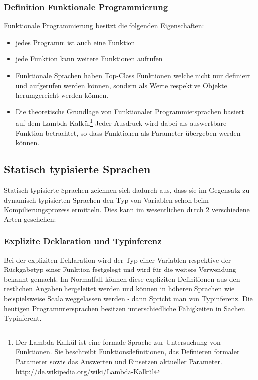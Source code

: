 \subsubsection{Definition Funktionale Programmierung}
Funktionale Programmierung besitzt die folgenden Eigenschaften:
\begin{itemize}
\item jedes Programm ist auch eine Funktion
\item jede Funktion kann weitere Funktionen aufrufen
\item Funktionale Sprachen haben Top-Class Funktionen welche nicht nur definiert und aufgerufen werden k\"onnen, sondern als Werte respektive Objekte herumgereicht werden k\"onnen.
\item Die theoretische Grundlage von Funktionaler Programmiersprachen basiert auf dem Lambda-Kalk\"ul\footnote{Der Lambda-Kalk\"ul ist eine formale Sprache zur Untersuchung von Funktionen. Sie beschreibt Funktionsdefinitionen, das Definieren formaler Parameter sowie das Auswerten und Einsetzen aktueller Parameter. http://de.wikipedia.org/wiki/Lambda-Kalk\"ul} Jeder Ausdruck wird dabei als auswertbare Funktion betrachtet, so dass Funktionen als Parameter \"ubergeben werden k\"onnen.
\end{itemize}





\subsection{Statisch typisierte Sprachen}
Statisch typisierte Sprachen zeichnen sich dadurch aus, dass sie im Gegensatz zu dynamisch typisierten Sprachen den Typ von Variablen schon beim Kompilierungsprozess ermitteln. Dies kann im wesentlichen durch 2 verschiedene Arten geschehen:

\subsubsection{Explizite Deklaration und Typinferenz}
Bei der expliziten Deklaration wird der Typ einer Variablen respektive der R\"uckgabetyp einer Funktion festgelegt und wird f\"ur die weitere Verwendung bekannt gemacht. Im Normalfall k\"onnen diese expliziten Definitionen aus den restlichen Angaben hergeleitet werden und k\"onnen in h\"oheren Sprachen wie beispielsweise Scala weggelassen werden - dann Spricht man von Typinferenz. Die heutigen Programmiersprachen besitzen unterschiedliche F\"ahigkeiten in Sachen Typinferent. 

